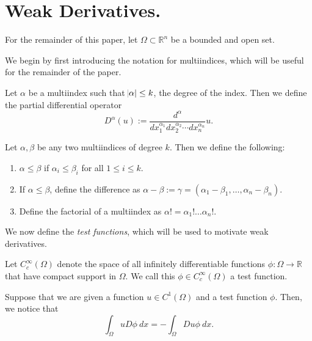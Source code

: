\documentclass[10pt]{article}
\begin{document}

\section{Weak Derivatives.}
\begin{remark}
	For the remainder of this paper, let $\Omega \subset \mathbb{R}^n$ be a bounded and open set.
\end{remark}
We begin by first introducing the notation for multiindices, which will be useful for the remainder of the paper. 
\begin{definition}
	Let $\alpha$ be a multiindex such that $\abs{\alpha} \leq k$, the degree of the index. Then we define the partial differential operator
	\begin{equation*}
		D^{\alpha}(u) := \frac{d^{\alpha}}{dx_1^{\alpha_1}dx_2^{\alpha_2}\cdots dx_n^{\alpha_n}} u.
	\end{equation*}
\end{definition}
\begin{definition}
	Let $\alpha, \beta$ be any two multiindices of degree $k$. Then we define the following:
	\begin{enumerate}
		\item $\alpha \leq \beta$ if $\alpha_i \leq \beta_i$ for all $1 \leq i \leq k$. 
		\item If $\alpha \leq \beta$, define the difference as $\alpha - \beta := \gamma = (\alpha_1 - \beta_1, \dots, \alpha_n - \beta_n)$.
		\item Define the factorial of a multiindex as $\alpha! = \alpha_1!\dots \alpha_n!$.
	\end{enumerate}
\end{definition}
We now define the \textit{test functions}, which will be used to motivate weak derivatives.  
\begin{definition}
	Let $C_c^\infty(\Omega)$ denote the space of all infinitely differentiable functions $\phi: \Omega \to \mathbb{R}$ that have compact support in $\Omega$. We call this $\phi \in C_c^{\infty}(\Omega)$ a test function.
\end{definition}
Suppose that we are given a function $u \in C^1(\Omega)$ and a test function $\phi$. Then, we notice that 
\begin{equation*}
	\displaystyle \int_{\Omega}{uD\phi \: dx} = -\int_{\Omega}{Du \phi \: dx}. 
\end{equation*}
\end{document}
